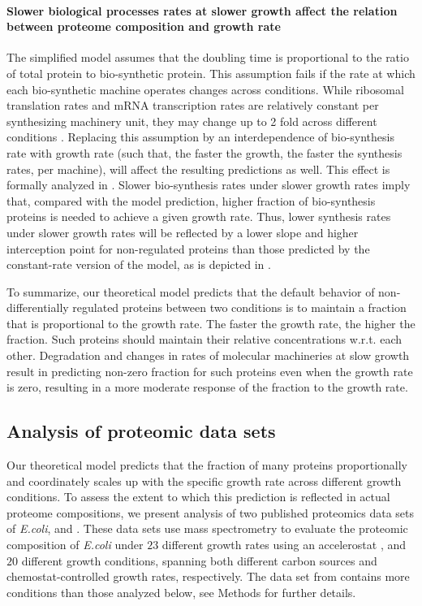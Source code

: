\documentclass[10pt,letterpaper]{article}
\newcommand{\hConds}{$20$}
\newcommand{\vnCondsnum}{23}
\newcommand{\vnConds}{$\vnCondsnum$}
\newcommand{\vConds}{\vnConds{}}
\begin{document}
\paragraph{Slower biological processes rates at slower growth affect the relation between proteome composition and growth rate}

The simplified model assumes that the doubling time is proportional to the ratio of total protein to bio-synthetic protein.
This assumption fails if the rate at which each bio-synthetic machine operates changes across conditions.
While ribosomal translation rates and mRNA transcription rates are relatively constant per synthesizing machinery unit, they may change up to 2 fold across different conditions \cite{Bremer1987}.
Replacing this assumption by an interdependence of bio-synthesis rate with growth rate (such that, the faster the growth, the faster the synthesis rates, per machine)\cite{Bremer1987,Valgepea2013}, will affect the resulting predictions as well.
This effect is formally analyzed in .
Slower bio-synthesis rates under slower growth rates imply that, compared with the model prediction, higher fraction of bio-synthesis proteins is needed to achieve a given growth rate.
Thus, lower synthesis rates under slower growth rates will be reflected by a lower slope and higher interception point for non-regulated proteins than those predicted by the constant-rate version of the model, as is depicted in .

To summarize, our theoretical model predicts that the default behavior of non-differentially regulated proteins between two conditions is to maintain a fraction that is proportional to the growth rate.
The faster the growth rate, the higher the fraction.
Such proteins should maintain their relative concentrations w.r.t. each other.
Degradation and changes in rates of molecular machineries at slow growth result in predicting non-zero fraction for such proteins even when the growth rate is zero, resulting in a more moderate response of the fraction to the growth rate.

\subsection*{Analysis of proteomic data sets}
Our theoretical model predicts that the fraction of many proteins proportionally and coordinately scales up with the specific growth rate across different growth conditions.
To assess the extent to which this prediction is reflected in actual proteome compositions, we present analysis of two published proteomics data sets of \emph{E.coli}, \cite{Peebo_2015} and \cite{Schmidt2015}.
These data sets use mass spectrometry to evaluate the proteomic composition of \emph{E.coli} under \vConds{} different growth rates using an accelerostat \cite{Paalme_1995}, and \hConds{} different growth conditions, spanning both different carbon sources and chemostat-controlled growth rates, respectively.
The data set from \cite{Schmidt2015} contains more conditions than those analyzed below, see Methods for further details.
\end{document}
